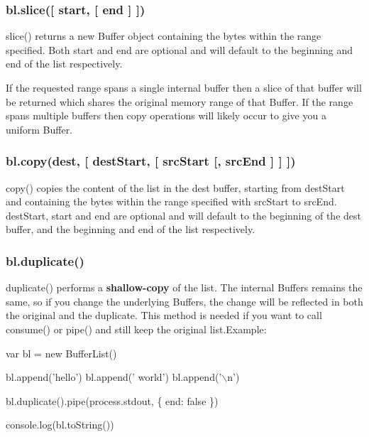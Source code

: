  \subsubsection*{bl.\+slice(\mbox{[} start, \mbox{[} end \mbox{]} \mbox{]})}

{\ttfamily slice()} returns a new {\ttfamily Buffer} object containing the bytes within the range specified. Both {\ttfamily start} and {\ttfamily end} are optional and will default to the beginning and end of the list respectively.

If the requested range spans a single internal buffer then a slice of that buffer will be returned which shares the original memory range of that Buffer. If the range spans multiple buffers then copy operations will likely occur to give you a uniform Buffer. 

 \label{_copy}%
 \subsubsection*{bl.\+copy(dest, \mbox{[} dest\+Start, \mbox{[} src\+Start \mbox{[}, src\+End \mbox{]} \mbox{]} \mbox{]})}

{\ttfamily copy()} copies the content of the list in the {\ttfamily dest} buffer, starting from {\ttfamily dest\+Start} and containing the bytes within the range specified with {\ttfamily src\+Start} to {\ttfamily src\+End}. {\ttfamily dest\+Start}, {\ttfamily start} and {\ttfamily end} are optional and will default to the beginning of the {\ttfamily dest} buffer, and the beginning and end of the list respectively. 

 \label{_duplicate}%
 \subsubsection*{bl.\+duplicate()}

{\ttfamily duplicate()} performs a {\bfseries shallow-\/copy} of the list. The internal Buffers remains the same, so if you change the underlying Buffers, the change will be reflected in both the original and the duplicate. This method is needed if you want to call {\ttfamily consume()} or {\ttfamily pipe()} and still keep the original list.\+Example\+:


\begin{DoxyCode}
var bl = \textcolor{keyword}{new} BufferList()

bl.append('hello')
bl.append(' world')
bl.append('\(\backslash\)n')

bl.duplicate().pipe(process.stdout, \{ end: \textcolor{keyword}{false} \})

console.log(bl.toString())
\end{DoxyCode}
 

